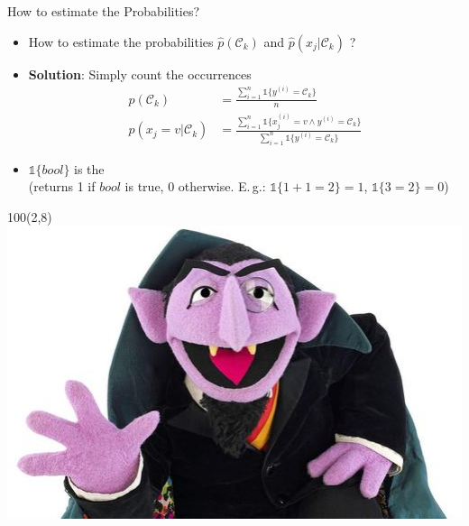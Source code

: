 \begin{frame}{How to estimate the Probabilities?}{}
	\begin{itemize}
		\item How to estimate the probabilities $\widehat{p}(\mathcal{C}_k)$ and $\widehat{p}(x_j \vert \mathcal{C}_k)$ ?
		\item \textbf{Solution}: Simply count the occurrences
		\begin{align}
			\widehat{p}(\mathcal{C}_k)
				&= \frac{\sum_{i=1}^n \mathbb{1}\{ y^{(i)} = \mathcal{C}_k \}}{n} \\[3mm]
			\widehat{p}(x_j = v \vert \mathcal{C}_k)
				&= \frac{\sum_{i=1}^n \mathbb{1}\{ x_j^{(i)} = v \wedge y^{(i)} = \mathcal{C}_k \}}
					{\sum_{i=1}^n \mathbb{1}\{ y^{(i)} = \mathcal{C}_k \}}
		\end{align}
		\item $\mathbb{1}\{ bool \}$ is the  \\[-1mm]
			{\scriptsize (returns 1 if $bool$ is true, 0 otherwise.
			E.\,g.: $\mathbb{1}\{1+1=2\} = 1$, $\mathbb{1}\{3=2\} = 0$)}
	\end{itemize}
	\begin{textblock}{100}(2,8)
		\includegraphics[scale=0.5]{03_decision_theory/02_img/count_count}
	\end{textblock}
\end{frame}


